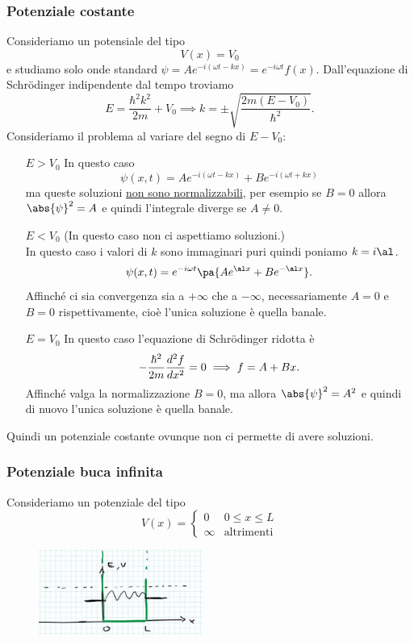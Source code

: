 \subsubsection{Potenziale costante}
Consideriamo un potensiale del tipo
\[V(x)=V_0\]
e studiamo solo onde standard $\psi=Ae^{-i(\omega t-kx)}=e^{-i\omega t}f(x)$. Dall'equazione di Schr\"odinger indipendente dal tempo troviamo
\[E=\frac{\hbar^2 k^2}{2m}+V_0\implies k=\pm\sqrt{\frac{2m(E-V_0)}{\hbar^2}}.\]
Consideriamo il problema al variare del segno di $E-V_0$:
\setlength{\leftmargini}{0cm}
\begin{itemize}
\item[$\boxed{E>V_0}$] In questo caso 
\[\psi(x,t)=Ae^{-i(\omega t-kx)}+Be^{-i(\omega t+kx)}\]
ma queste soluzioni \underline{non sono normalizzabili}, per esempio se $B=0$ allora $\abs{\psi}^2=A$ e quindi l'integrale diverge se $A\neq 0$.
\item[$\boxed{E<V_0}$] (In questo caso non ci aspettiamo soluzioni.)\\
In questo caso i valori di $k$ sono immaginari puri quindi poniamo $k=i\al$.
\[\psi(x,t)=e^{-i\omega t}\pa{Ae^{\al x}+B e^{-\al x}}.\]
Affinch\'e ci sia convergenza sia a $+\infty$ che a $-\infty$, necessariamente $A=0$ e $B=0$ rispettivamente, cio\`e l'unica soluzione \`e quella banale.
\item[$\boxed{E=V_0}$] In questo caso l'equazione di Schr\"odinger ridotta \`e
\[-\frac{\hbar^2}{2m}\dds[2]x f=0\implies f=A+Bx.\]
Affinch\'e valga la normalizzazione $B=0$, ma allora $\abs{\psi}^2=A^2$ e quindi di nuovo l'unica soluzione \`e quella banale.
\end{itemize}
\setlength{\leftmargini}{0.5cm}
Quindi un potenziale costante ovunque non ci permette di avere soluzioni.


\subsubsection{Potenziale buca infinita}
Consideriamo un potenziale del tipo
\[V(x)=\begin{cases}
0 &0\leq x\leq L\\
\infty &\text{altrimenti}
\end{cases}\]

\begin{figure}[!htb]
    \centering
    \includegraphics[width=5.4cm]{images/buca_infinita.png}
\end{figure}

